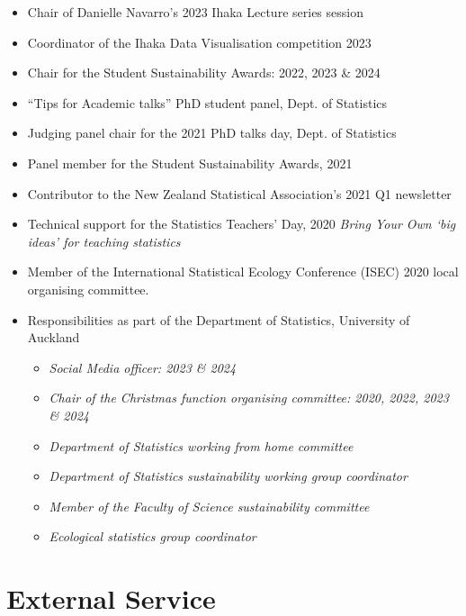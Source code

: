 \documentclass[10pt,a4paper]{moderncv}
\begin{document}
\begin{itemize}
  \item Chair of Danielle Navarro's 2023 Ihaka Lecture series session
  \item Coordinator of the Ihaka Data Visualisation competition 2023
  \item Chair for the Student Sustainability Awards: 2022, 2023 \& 2024
  \item ``Tips for Academic talks'' PhD student panel, Dept. of Statistics
  \item Judging panel chair for the 2021 PhD talks day, Dept. of Statistics
  \item Panel member for the Student Sustainability Awards, 2021
  \item Contributor to the New Zealand Statistical Association's 2021 Q1 newsletter
  \item Technical support for the Statistics Teachers' Day, 2020 \textit{Bring Your Own `big ideas' for teaching statistics}
\item Member of the International Statistical Ecology Conference (ISEC) 2020 local organising committee.
\item Responsibilities as part of the Department of Statistics, University of Auckland
  \begin{itemize}
  \item \textit{Social Media officer: 2023 \& 2024}
  \item \textit{Chair of the Christmas function organising committee: 2020, 2022, 2023 \& 2024}
  \item \textit{Department of Statistics working from home committee}
  \item \textit{Department of Statistics sustainability working group coordinator}
  \item \textit{Member of the Faculty of Science sustainability committee}
  \item \textit{Ecological statistics group coordinator}
  \end{itemize}
\end{itemize}



\section{External Service}
\vspace{6pt}
\end{document}
